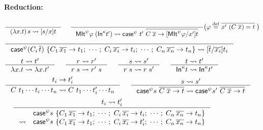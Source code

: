 \begin{figure}
\begin{framed}
\paragraph{Reduction:} 
\[ \inference{}{(\lambda x.t)\,s \rightsquigarrow [s/x]t}
 ~~~~
   \inference{}
      { \MIt^\psi \varphi\;(\In^\kappa t') \rightsquigarrow
        \case^\psi~t'~\overline{C\;\overline{x} -> [\MIt^\psi \varphi/x']t} }
      \big( \varphi \defeq \overline{x' ~ (C\;\overline{x}) = t}\; \big)
\]
\[ \inference{}
             {\case^\psi (C_i\,\overline{t}) ~
                \{C_1\,\overline{x_1} -> t_1;\;\cdots;\;
                  C_i\,\overline{x_i} -> t_i;\;\cdots;\;
                  C_n\,\overline{x_n} -> t_n \}
              \rightsquigarrow
              [\overline{t}/\overline{x_i}]t_i }
\]
\[  \inference{t \rightsquigarrow t'}{\lambda x.t \rightsquigarrow \lambda x.t'}
 ~~~~
   \inference{r \rightsquigarrow r'}{r\;s \rightsquigarrow r'\;s}
 ~~~~
   \inference{s \rightsquigarrow s'}{r\;s \rightsquigarrow r\;s'}
 ~~~~
   \inference{t \rightsquigarrow t'}
             {\In^\kappa t \rightsquigarrow \In^\kappa t'}
\]
\[ \inference{t_i \to t_i'}
             {C~t_1\cdots t_i \cdots t_n \rightsquigarrow
              C~t_1\cdots t_i'\cdots t_n }
 ~~~~
   \inference{s \rightsquigarrow s'}
             {\case^\psi s ~\overline{C\;\overline{x} -> t} \rightsquigarrow
              \case^\psi s'~\overline{C\;\overline{x} -> t} }
\]
\[ \inference{t_i \rightsquigarrow t_i' }
             {\begin{matrix}
             &\case^\psi s ~
                \{C_1\,\overline{x_1} -> t_1;\;\cdots;\;
                  C_i\,\overline{x_i} -> t_i;\;\cdots;\;
                  C_n\,\overline{x_n} -> t_n \} \\
             \rightsquigarrow
             &\case^\psi s ~
                \{C_1\,\overline{x_1} -> t_1;\;\cdots;\;
                  C_i\,\overline{x_i} -> t_i';\;\cdots;\;
                  C_n\,\overline{x_n} -> t_n \} \end{matrix} }
\]


\end{framed}
\end{figure}
